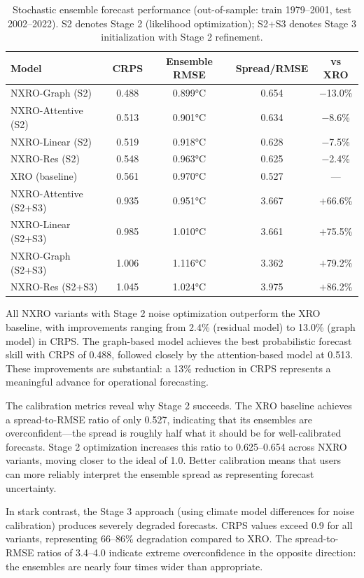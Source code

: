 \begin{table}[htbp]
\centering
\caption{Stochastic ensemble forecast performance (out-of-sample: train 1979--2001, test 2002--2022). S2 denotes Stage 2 (likelihood optimization); S2+S3 denotes Stage 3 initialization with Stage 2 refinement.}
\label{tab:stochastic_outsample}
\begin{tabular}{lcccc}
\toprule
\textbf{Model} & \textbf{CRPS} & \textbf{Ensemble RMSE} & \textbf{Spread/RMSE} & \textbf{vs XRO} \\
\midrule
NXRO-Graph (S2) & 0.488 & 0.899°C & 0.654 & $-$13.0\% \\
NXRO-Attentive (S2) & 0.513 & 0.901°C & 0.634 & $-$8.6\% \\
NXRO-Linear (S2) & 0.519 & 0.918°C & 0.628 & $-$7.5\% \\
NXRO-Res (S2) & 0.548 & 0.963°C & 0.625 & $-$2.4\% \\
XRO (baseline) & 0.561 & 0.970°C & 0.527 & --- \\
\midrule
NXRO-Attentive (S2+S3) & 0.935 & 0.951°C & 3.667 & $+$66.6\% \\
NXRO-Linear (S2+S3) & 0.985 & 1.010°C & 3.661 & $+$75.5\% \\
NXRO-Graph (S2+S3) & 1.006 & 1.116°C & 3.362 & $+$79.2\% \\
NXRO-Res (S2+S3) & 1.045 & 1.024°C & 3.975 & $+$86.2\% \\
\bottomrule
\end{tabular}
\end{table}

All NXRO variants with Stage 2 noise optimization outperform the XRO baseline, with improvements ranging from 2.4\% (residual model) to 13.0\% (graph model) in CRPS. The graph-based model achieves the best probabilistic forecast skill with CRPS of 0.488, followed closely by the attention-based model at 0.513. These improvements are substantial: a 13\% reduction in CRPS represents a meaningful advance for operational forecasting.

The calibration metrics reveal why Stage 2 succeeds. The XRO baseline achieves a spread-to-RMSE ratio of only 0.527, indicating that its ensembles are overconfident---the spread is roughly half what it should be for well-calibrated forecasts. Stage 2 optimization increases this ratio to 0.625--0.654 across NXRO variants, moving closer to the ideal of 1.0. Better calibration means that users can more reliably interpret the ensemble spread as representing forecast uncertainty.

In stark contrast, the Stage 3 approach (using climate model differences for noise calibration) produces severely degraded forecasts. CRPS values exceed 0.9 for all variants, representing 66--86\% degradation compared to XRO. The spread-to-RMSE ratios of 3.4--4.0 indicate extreme overconfidence in the opposite direction: the ensembles are nearly four times wider than appropriate.

